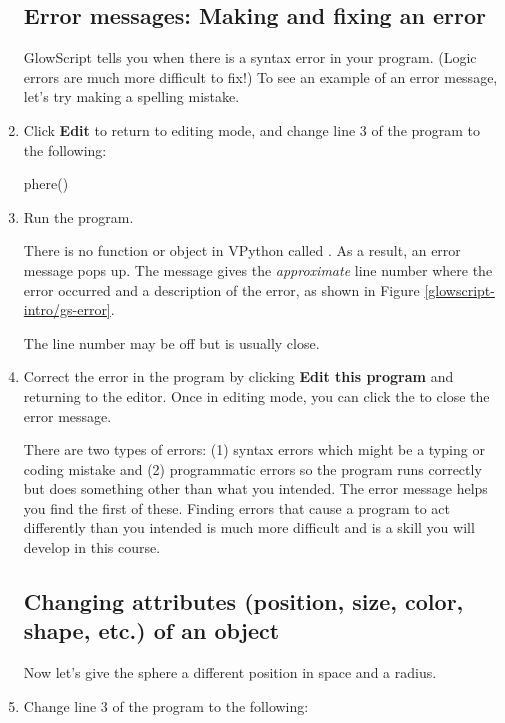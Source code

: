 \begin{enumerate}
	\subsection*{Error messages: Making and fixing an error}
	
	GlowScript tells you when there is a syntax error in  your program. (Logic errors are much more difficult to fix!) To see an example of an error message, let's try making a spelling mistake.
	
	\item Click {\bf Edit} to return to editing mode, and change line 3 of the program to the following:
	
\begin{myvpython}
phere()
\end{myvpython}

	\item Run the program.

There is no function or object in VPython called . As a result, an error message pops up. The message gives the \emph{approximate} line number where the error occurred and a description of the error, as shown in Figure \ref{glowscript-intro/gs-error}.


The line number may be off but is usually close.

	\item Correct the error in the program by clicking {\bf Edit this program} and returning to the editor. Once in editing mode, you can click the  to close the error message.

There are two types of errors: (1) syntax errors which might be a typing or coding mistake and (2) programmatic errors so the program runs correctly but does something other than what you intended. The error message helps you find the first of these. Finding errors that cause a program to act differently than you intended is much more difficult and is a skill you will develop in this course.
	
	\subsection*{Changing attributes (position, size, color, shape, etc.) of an object}
	
Now let's give the sphere a different position in space and a radius. 

	\item Change line 3 of the program to the following:


\end{enumerate}
